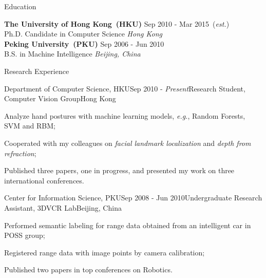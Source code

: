\documentclass{cv_professional-en} %
\begin{document}

\begin{rSection}{Education}

{\bf The University of Hong Kong~(HKU)} \hfill Sep 2010 - Mar 2015~(\textit{est.}) \\ 
Ph.D. Candidate in Computer Science \hfill {\em Hong Kong}\smallskip \\
{\bf Peking University~(PKU)} \hfill Sep 2006 - Jun 2010 \\ 
B.S. in Machine Intelligence \hfill {\em Beijing, China} 

\end{rSection}


\begin{rSection}{Research Experience}
    
\begin{rSubsection}{Department of Computer Science, HKU}{Sep 2010 - \textit{Present}}{Research Student, Computer Vision Group}{Hong Kong}
\item Analyze hand postures with machine learning models, \textit{e.g.}, Random Forests, SVM and RBM;
\item Cooperated with my colleagues on \textit{facial landmark localization} and \textit{depth from refraction};
\item Published three papers, one in progress, and presented my work on three international conferences.
\end{rSubsection}

\begin{rSubsection}{Center for Information Science, PKU}{Sep 2008 - Jun 2010}{Undergraduate Research Assistant, 3DVCR Lab}{Beijing, China}
    \item Performed semantic labeling for range data obtained from an intelligent car in POSS group;
    \item Registered range data with image points by camera calibration;
    \item Published two papers in top conferences on Robotics.
\end{rSubsection}

\end{rSection}
\end{document}
